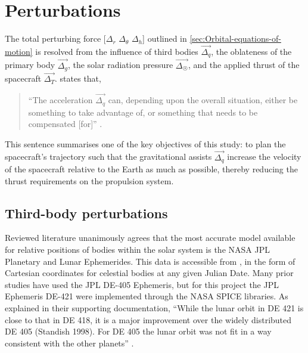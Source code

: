 \section{Perturbations} \label{sec:Perturbations}

The total perturbing force [$\Delta_r$ $\Delta_\theta$ $\Delta_h$] outlined in \autoref{sec:Orbital-equations-of-motion} is resolved from the influence of third bodies $\vec{\Delta_q}$, the oblateness of the primary body $\vec{\Delta_g}$, the solar radiation pressure $\vec{\Delta_\Sun}$, and the applied thrust of the spacecraft $\vec{\Delta_T}$. \textcite{Erb_thesis} states that, 
\begin{quotation}\enquote{The acceleration $\vec{\Delta_q}$ can, depending upon the overall situation, either be something to take advantage of, or something that needs to be compensated [for]} \parencite[p. 8]{Erb_thesis}. 
\end{quotation}
This sentence summarises one of the key objectives of this study: to plan the spacecraft's trajectory such that the gravitational assists $\vec{\Delta_q}$ increase the velocity of the spacecraft relative to the Earth as much as possible, thereby reducing the thrust requirements on the propulsion system.



\subsection{Third-body perturbations} \label{sub:Ephemerides}

Reviewed literature unanimously agrees that the most accurate model available for relative positions of bodies within the solar system is the NASA JPL Planetary and Lunar Ephemerides. This data is accessible from \textcite{web_HORIZONS}, in the form of Cartesian coordinates for celestial bodies at any given Julian Date. Many prior studies have used the JPL DE-405 Ephemeris, but for this project the JPL Ephemeris DE-421 were implemented through the NASA SPICE libraries. As explained in their supporting documentation, \enquote{While the lunar orbit in DE 421 is close to that in DE 418, it is a major improvement over the widely distributed DE 405 (Standish 1998). For DE 405 the lunar orbit was not fit in a way consistent with the other planets} \parencite[p. 1]{DE421}.

